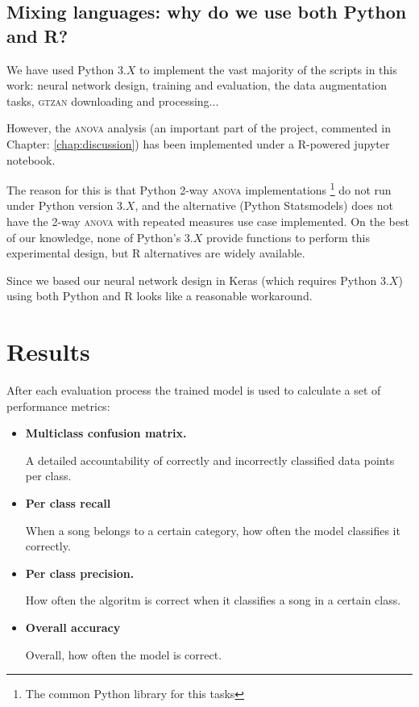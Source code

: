 \subsection{Mixing languages: why do we use both Python and R?}

We have used Python $3.X$ to implement the vast majority of the scripts in this work: neural network design, training and evaluation, the data augmentation tasks, \textsc{gtzan} downloading and processing...

However, the \textsc{anova} analysis (an important part of the project, commented in Chapter: \ref{chap:discussion}) has been implemented under a R-powered jupyter notebook.

The reason for this is that Python 2-way \textsc{anova} implementations \footnote{The common Python library for this tasks} do not run under Python version $3.X$, and the alternative (Python Statsmodels) does not have the 2-way \textsc{anova} with repeated measures use case implemented. On the best of our knowledge, none of Python's $3.X$ provide functions to perform this experimental design, but R alternatives are widely available.

Since we based our neural network design in Keras (which requires Python $3.X$) using both Python and R looks like a reasonable workaround.

\section{Results}

After each evaluation process the trained model is used to calculate a set of performance metrics:

\begin{itemize}
  \item {
    {\bf Multiclass confusion matrix.}

    A detailed accountability of correctly and incorrectly classified data points per class.
  }
  \item{
    {\bf Per class recall}

    When a song belongs to a certain category, how often the model classifies it correctly.
  }
  \item {
    {\bf Per class precision.}

    How often the algoritm is correct when it classifies a song in a certain class.
  }

  \item {
    {\bf Overall accuracy}

    Overall, how often the model is correct.
  }

\end{itemize}

